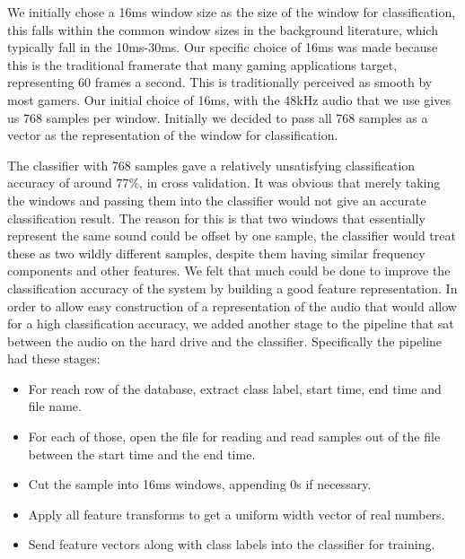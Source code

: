 \documentclass[ %
                    author={Sam Phippen},
                supervisor={Dr. Rafal Bogacz},
                     title={Real time voice activity detectors in noisy personal computing environments},
                  subtitle={},
                    degree={MEng},
                      year={2012} ]{thesis}
\begin{document}
We initially chose a 16ms window size as the size of the window for
classification, this falls within the common window sizes in the background
literature, which typically fall in the 10ms-30ms. Our specific choice of 16ms
was made because this is the traditional framerate that many gaming
applications target, representing 60 frames a second. This is traditionally
perceived as smooth by most gamers. Our initial choice of 16ms, with the 48kHz
audio that we use gives us 768 samples per window. Initially we decided to pass
all 768 samples as a vector as the representation of the window for
classification.

The classifier with 768 samples gave a relatively unsatisfying classification
accuracy of around 77\%, in cross validation. It was obvious that merely taking
the windows and passing them into the classifier would not give an accurate
classification result. The reason for this is that two windows that essentially
represent the same sound could be offset by one sample, the classifier would
treat these as two wildly different samples, despite them having similar
frequency components and other features. We felt that much could be done to
improve the classification accuracy of the system by building a good feature
representation. In order to allow easy construction of a representation of the
audio that would allow for a high classification accuracy, we added another
stage to the pipeline that sat between the audio on the hard drive and the
classifier. Specifically the pipeline had these stages:

\begin{itemize}

    \item For reach row of the database, extract class label, start time, end
        time and file name.

    \item For each of those, open the file for reading and read samples out of
        the file between the start time and the end time.

    \item Cut the sample into 16ms windows, appending 0s if necessary.

    \item Apply all feature transforms to get a uniform width vector of real
        numbers.

    \item Send feature vectors along with class labels into the classifier for
        training.

\end{itemize}
\end{document}

